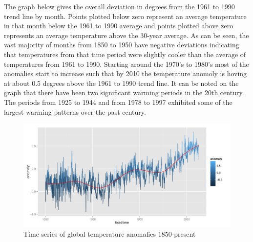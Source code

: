 \documentclass{article}\usepackage{graphicx, color}
\newenvironment{knitrout}{}{} %
\begin{document}
The graph below gives the overall deviation in degrees from the 1961 to 1990 trend line by month. Points plotted below zero represent an average temperature in that month below the 1961 to 1990 average and points plotted above zero represents an average temperature above the 30-year average. As can be seen, the vast majority of months from 1850 to 1950 have negative deviations indicating that temperatures from that time period were slightly cooler than the average of temperatures from 1961 to 1990. Starting around the 1970's to 1980's most of the anomalies start to increase such that by 2010 the temperature anomoly is hoving at about 0.5 degrees above the 1961 to 1990 trend line. It can be noted on the graph that there have been two significant warming periods in the 20th century. The periods from 1925 to 1944 and from 1978 to 1997 exhibited some of the largest warming patterns over the past century.
\begin{figure}[H]
\begin{knitrout}
\color{fgcolor}\includegraphics[width=\linewidth]{figure/plot-trend} 
\end{knitrout}

\caption{\label{alltopresent}Time series of global temperature anomalies 1850-present}
\end{figure}
\end{document}
